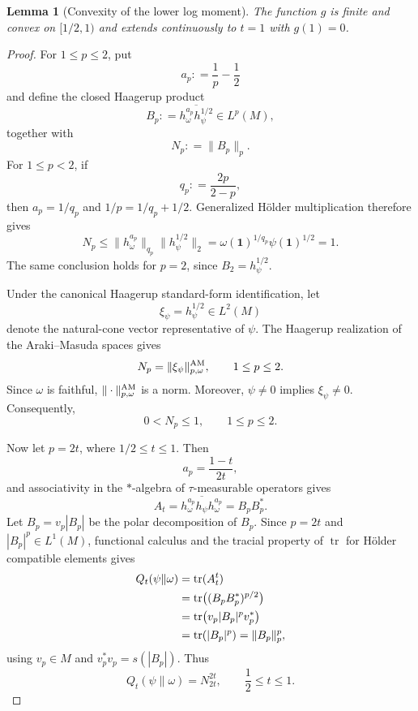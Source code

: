 \documentclass[12pt]{article}
\numberwithin{equation}{section}
\newtheorem{lemma}[theorem]{Lemma}
\theoremstyle{definition}
\theoremstyle{remark}
\newcommand{\one}{\mathbf 1}
\newcommand{\?}{\overset{?}{=}}
\newcommand{\defeq}{\mathrel{\mathop:}=}
\DeclareMathOperator{\tr}{tr}
\begin{document}
\begin{lemma}[Convexity of the lower log moment]
\label{lem:lower-log-convexity}
The function $g$ is finite and convex on $[1/2,1)$ and extends
continuously to $t=1$ with $g(1)=0$.
\end{lemma}

\begin{proof}
For $1\leq p\leq2$, put
\[
  a_p\defeq \frac1p-\frac12
\]
and define the closed Haagerup product
\begin{equation}
  B_p
  \defeq
  \overline{h_\omega^{a_p}h_\psi^{1/2}}
  \in L^p(M),
\end{equation}
together with
\begin{equation}
  N_p\defeq\|B_p\|_p.
  \label{eq:lower-weighted-norm}
\end{equation}
For $1\leq p<2$, if
\[
  q_p\defeq\frac{2p}{2-p},
\]
then $a_p=1/q_p$ and $1/p=1/q_p+1/2$.  Generalized
H\"older multiplication therefore gives
\[
  N_p
  \leq
  \|h_\omega^{a_p}\|_{q_p}
  \|h_\psi^{1/2}\|_2
  =
  \omega(\one)^{1/q_p}\psi(\one)^{1/2}
  =1.
\]
The same conclusion holds for $p=2$, since
$B_2=h_\psi^{1/2}$.

Under the canonical Haagerup standard-form identification, let
\[
  \xi_\psi=h_\psi^{1/2}\in L^2(M)
\]
denote the natural-cone vector representative of $\psi$.  The Haagerup
realization of the Araki--Masuda spaces
\cite{Berta:2016vnw,Jencova:2017txf,Kato:2023aro} gives
\begin{equation}
  N_p=\|\xi_\psi\|_{p,\omega}^{\rm AM},
  \qquad 1\leq p\leq2.
  \label{eq:lower-haagerup-am-identification}
\end{equation}
Since $\omega$ is faithful, $\|\cdot\|_{p,\omega}^{\rm AM}$ is a norm.
Moreover, $\psi\neq0$ implies $\xi_\psi\neq0$.  Consequently,
\[
  0<N_p\leq1,
  \qquad 1\leq p\leq2.
\]

Now let $p=2t$, where $1/2\leq t\leq1$.  Then
\[
  a_p=\frac{1-t}{2t},
\]
and associativity in the $*$-algebra of $\tau$-measurable operators
gives
\begin{equation}
  A_t
  =
  \overline{
    h_\omega^{a_p}h_\psi h_\omega^{a_p}}
  =
  B_pB_p^*.
  \label{eq:lower-factor-from-Bp}
\end{equation}
Let $B_p=v_p|B_p|$ be the polar decomposition of $B_p$.  Since
$p=2t$ and $|B_p|^p\in L^1(M)$, functional calculus and the tracial
property of $\tr$ for H\"older compatible elements gives
\begin{align}
  Q_t(\psi\|\omega)
  &=\tr(A_t^t) \notag\\
  &=\tr\bigl((B_pB_p^*)^{p/2}\bigr) \notag\\
  &=\tr\bigl(v_p|B_p|^p v_p^*\bigr) \notag\\
  &=\tr(|B_p|^p)
   =\|B_p\|_p^p,
\end{align}
using $v_p\in M$ and $v_p^*v_p=s(|B_p|)$. 
Thus
\begin{equation}
  Q_t(\psi\|\omega)=N_{2t}^{2t},
  \qquad \frac12\leq t\leq1.
  \label{eq:lower-moment-weighted-norm}
\end{equation}


\end{proof}
\end{document}
